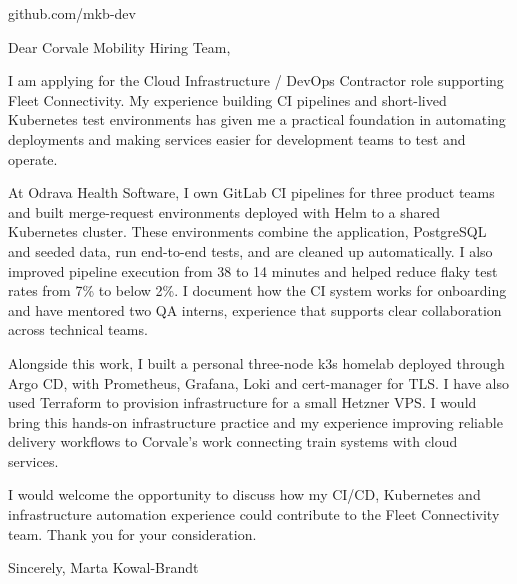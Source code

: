 \documentclass[11pt,a4paper]{article}
\begin{document}
github.com/mkb-dev

Dear Corvale Mobility Hiring Team,

I am applying for the Cloud Infrastructure / DevOps Contractor role supporting Fleet Connectivity. My experience building CI pipelines and short-lived Kubernetes test environments has given me a practical foundation in automating deployments and making services easier for development teams to test and operate.

At Odrava Health Software, I own GitLab CI pipelines for three product teams and built merge-request environments deployed with Helm to a shared Kubernetes cluster. These environments combine the application, PostgreSQL and seeded data, run end-to-end tests, and are cleaned up automatically. I also improved pipeline execution from 38 to 14 minutes and helped reduce flaky test rates from 7\% to below 2\%. I document how the CI system works for onboarding and have mentored two QA interns, experience that supports clear collaboration across technical teams.

Alongside this work, I built a personal three-node k3s homelab deployed through Argo CD, with Prometheus, Grafana, Loki and cert-manager for TLS. I have also used Terraform to provision infrastructure for a small Hetzner VPS. I would bring this hands-on infrastructure practice and my experience improving reliable delivery workflows to Corvale's work connecting train systems with cloud services.

I would welcome the opportunity to discuss how my CI/CD, Kubernetes and infrastructure automation experience could contribute to the Fleet Connectivity team. Thank you for your consideration.

Sincerely,
Marta Kowal-Brandt
\end{document}
